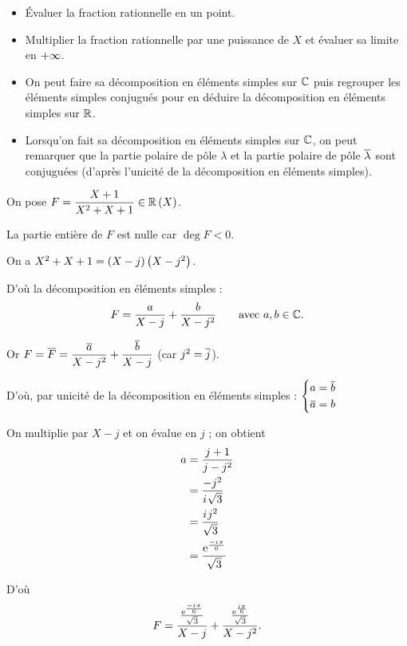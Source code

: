 \begin{meth}
\begin{itemize}
\item Évaluer la fraction rationnelle en un point. \\

\item Multiplier la fraction rationnelle par une puissance de \(X\) et évaluer sa limite en \(+\infty\).
\end{itemize}
\end{meth}

\begin{meth}
\begin{itemize}
\item On peut faire sa décomposition en éléments simples sur \(\mathbb{C}\) puis regrouper les éléments simples conjugués pour en déduire la décomposition en éléments simples sur \(\mathbb{R}\). \\

\item Lorsqu'on fait sa décomposition en éléments simples sur \(\mathbb{C}\), on peut remarquer que la partie polaire de pôle \(\lambda\) et la partie polaire de pôle \(\overline{\lambda}\) sont conjuguées (d'après l'unicité de la décomposition en éléments simples).
\end{itemize}
\end{meth}

\begin{ex}
On pose \(F=\dfrac{X+1}{X^2+X+1}\in\fracrat[\R]\).

La partie entière de \(F\) est nulle car \(\deg F<0\).

On a \(X^2+X+1=\left(X-j\right)\left(X-j^2\right)\).

D'où la décomposition en éléments simples : \[F=\dfrac{a}{X-j}+\dfrac{b}{X-j^2}\qquad\text{avec }a,b\in\mathbb{C}.\]

Or \(F=\overline{F}=\dfrac{\overline{a}}{X-j^2}+\dfrac{\overline{b}}{X-j}\) (car \(j^2=\overline{j}\)).

D'où, par unicité de la décomposition en éléments simples : \(\begin{dcases}a=\overline{b} \\ \overline{a}=b\end{dcases}\)

On multiplie par \(X-j\) et on évalue en \(j\) ; on obtient \[\begin{aligned}
a&=\dfrac{j+1}{j-j^2} \\
&=\dfrac{-j^2}{i\mkern1mu\sqrt{3}} \\
&=\dfrac{i\mkern1mu j^2}{\sqrt{3}} \\
&=\dfrac{\mathrm{e}^{\frac{-i\mkern1mu\pi}{6}}}{\sqrt{3}}
\end{aligned}\]

D'où \[F=\dfrac{\frac{\mathrm{e}^{\frac{-i\mkern1mu\pi}{6}}}{\sqrt{3}}}{X-j}+\dfrac{\frac{\mathrm{e}^{\frac{i\mkern1mu\pi}{6}}}{\sqrt{3}}}{X-j^2}.\]
\end{ex}

